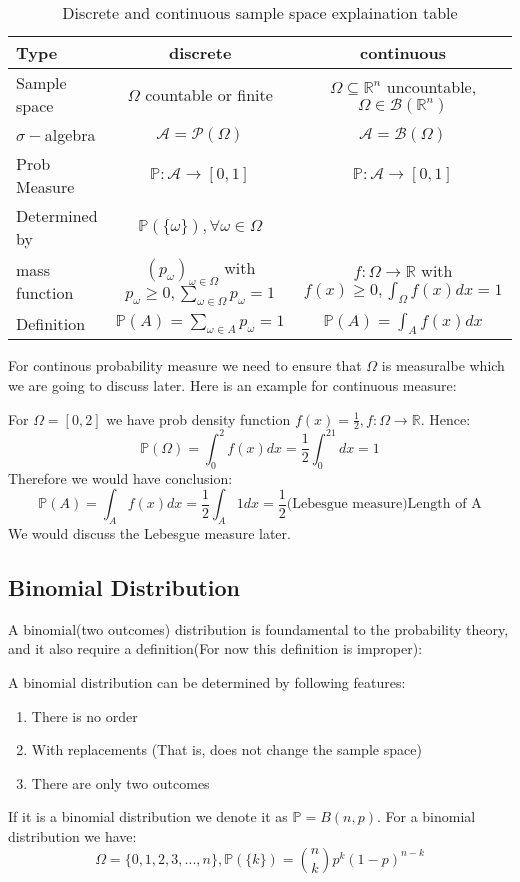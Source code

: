 \documentclass{article}
\newcommand{\R}{\mathbb{R}}
\newcommand{\Prob}{\mathbb{P}}
\begin{document}
\begin{table}[hbt]
\centering
  \begin{tabular}{l|c|c}
   Type & discrete & continuous \\
    \hline
 Sample space   & $\Omega$ countable or finite& $\Omega\subseteq \R^n$ uncountable, $\Omega\in \mathcal{B}(\R^n)$ \\
 $\sigma-$algebra   & $\mathcal{A}=\mathcal{P}(\Omega)$ & $\mathcal{A}=\mathcal{B}(\Omega)$\\
 Prob Measure & $\Prob: \mathcal{A}\to [0,1]$ & $\Prob: \mathcal{A}\to [0,1]$\\
 Determined by & $\Prob(\{\omega\}),\forall \omega\in \Omega$ & \\
mass function & $(p_\omega)_{\omega\in \Omega}$ with $p_\omega\geq 0,\sum_{\omega\in \Omega}p_\omega=1$ & $f:\Omega\to \R$ with $f(x)\geq 0,\int_{ \Omega}f(x)dx=1$ \\
 Definition & $\Prob(A)= \sum_{\omega\in A}p_\omega=1$ & $\Prob(A)=\int_Af(x)dx$
  \end{tabular}
  \caption{Discrete and continuous sample space explaination table}
\end{table}
For continous probability measure we need to ensure that $\Omega$ is measuralbe which we are going to discuss later. Here is an example for continuous measure:

\begin{example}
	For $\Omega=[0,2]$ we have prob density function $f(x)=\frac{1}{2},f:\Omega\to \R$. Hence:
	\begin{equation*}
		\Prob(\Omega)=\int_0^2f(x)dx=\frac{1}{2} \int_0^21dx=1
	\end{equation*} 
	Therefore we would have conclusion:
	\begin{equation*}
		\Prob(A)=\int_A f(x)dx=\frac{1}{2}\int_A1dx=\frac{1}{2}\text{(Lebesgue measure)Length of A}
	\end{equation*}
	We would discuss the Lebesgue measure later.
\end{example}

\subsection{Binomial Distribution}
A binomial(two outcomes) distribution is foundamental to the probability theory, and it also require a definition(For now this definition is improper):
\begin{definition}
	A binomial distribution can be determined by following features:
	\begin{enumerate}
		\item There is no order
		\item With replacements (That is, does not change the sample space)
		\item There are only two outcomes
	\end{enumerate}
	If it is a binomial distribution we denote it as $\Prob=B(n,p)$. For a binomial distribution we have:
	\begin{equation*}
		\Omega=\{0,1,2,3,...,n\},\Prob(\{k\})= {n\choose k}p^k(1-p)^{n-k}
	\end{equation*}
\end{definition}
\end{document}
